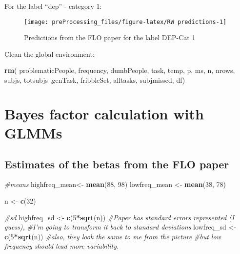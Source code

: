 \documentclass[
]{article}
\newenvironment{Shaded}{\begin{snugshade}}{\end{snugshade}}
\newcommand{\CommentTok}[1]{\textcolor[rgb]{0.56,0.35,0.01}{\textit{#1}}}
\newcommand{\DecValTok}[1]{\textcolor[rgb]{0.00,0.00,0.81}{#1}}
\newcommand{\KeywordTok}[1]{\textcolor[rgb]{0.13,0.29,0.53}{\textbf{#1}}}
\newcommand{\NormalTok}[1]{#1}
\newcommand{\OperatorTok}[1]{\textcolor[rgb]{0.81,0.36,0.00}{\textbf{#1}}}
\newcommand{\StringTok}[1]{\textcolor[rgb]{0.31,0.60,0.02}{#1}}
\begin{document}
For the label ``dep'' - category 1:

\begin{figure}

{\centering \texttt{[image: preProcessing\_files/figure-latex/RW predictions-1]} 

}

\caption{Predictions from the FLO paper for the label DEP-Cat 1}\label{fig:RW predictions}
\end{figure}

Clean the global environment:

\begin{Shaded}
\begin{Highlighting}[]
\KeywordTok{rm}\NormalTok{( problematicPeople, frequency, dumbPeople,  task, temp,  p, ms, n, nrows, subjs, totsubjs ,genTask, fribbleSet, alltasks, subjmissed, df)}
\end{Highlighting}
\end{Shaded}

\hypertarget{bayes-factor-calculation-with-glmms}{%
\section{Bayes factor calculation with
GLMMs}\label{bayes-factor-calculation-with-glmms}}

\hypertarget{estimates-of-the-betas-from-the-flo-paper}{%
\subsection{Estimates of the betas from the FLO
paper}\label{estimates-of-the-betas-from-the-flo-paper}}

\begin{Shaded}
\begin{Highlighting}[]
\CommentTok{#means}
\NormalTok{highfreq_mean<-}\StringTok{ }\KeywordTok{mean}\NormalTok{(}\DecValTok{88}\NormalTok{, }\DecValTok{98}\NormalTok{)}
\NormalTok{lowfreq_mean <-}\StringTok{ }\KeywordTok{mean}\NormalTok{(}\DecValTok{38}\NormalTok{, }\DecValTok{78}\NormalTok{)}

\NormalTok{n <-}\StringTok{ }\KeywordTok{c}\NormalTok{(}\DecValTok{32}\NormalTok{) }

\CommentTok{#sd}
\NormalTok{highfreq_sd <-}\StringTok{ }\KeywordTok{c}\NormalTok{(}\DecValTok{5}\OperatorTok{*}\KeywordTok{sqrt}\NormalTok{(n))  }\CommentTok{#Paper has standard errors represented (I guess),}
                     \CommentTok{#I'm going to transform it back to standard deviations}
\NormalTok{lowfreq_sd <-}\StringTok{ }\KeywordTok{c}\NormalTok{(}\DecValTok{5}\OperatorTok{*}\KeywordTok{sqrt}\NormalTok{(n)) }\CommentTok{#also, they look the same to me from the picture}
                           \CommentTok{#but low frequency should lead more variability.}
\end{Highlighting}
\end{Shaded}
\end{document}
